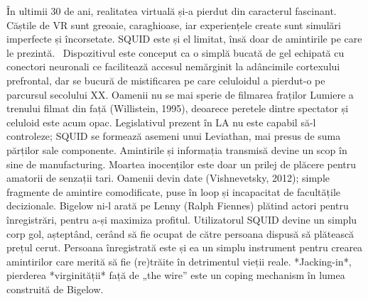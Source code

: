 \documentclass[a4paper, 12pt]{article}
\begin{document}
În ultimii 30 de ani, realitatea virtuală și-a pierdut din caracterul fascinant. Căștile de VR sunt greoaie, caraghioase, iar experiențele create sunt simulări imperfecte și încorsetate. SQUID este și el limitat, însă doar de amintirile pe care le prezintă. 
Dispozitivul este conceput ca o simplă bucată de gel echipată cu conectori neuronali ce facilitează accesul nemărginit la adâncimile cortexului prefrontal, dar se bucură de mistificarea pe care celuloidul a pierdut-o pe parcursul secolului XX. Oamenii nu se mai sperie de filmarea fraților Lumiere a trenului filmat din față (Willistein, 1995), deoarece peretele dintre spectator și celuloid este acum opac.
Legislativul prezent în LA nu este capabil să-l controleze; SQUID se formează asemeni unui Leviathan, mai presus de suma părților sale componente.
Amintirile și informația transmisă devine un scop în sine de manufacturing. Moartea inocenților este doar un prilej de plăcere pentru amatorii de senzații tari. Oamenii devin date (Vishnevetsky, 2012); simple fragmente de amintire comodificate, puse în loop și incapacitat de facultățile decizionale. Bigelow ni-l arată pe Lenny (Ralph Fiennes) plătind actori pentru înregistrări, pentru a-și maximiza profitul. Utilizatorul SQUID devine un simplu corp gol, așteptând, cerând să fie ocupat de către persoana dispusă să plătească prețul cerut. Persoana înregistrată este și ea un simplu instrument pentru crearea amintirilor care merită să fie (re)trăite în detrimentul vieții reale.
*Jacking-in*, pierderea *virginității* față de „the wire” este un coping mechanism în lumea construită de Bigelow. 
\end{document}
